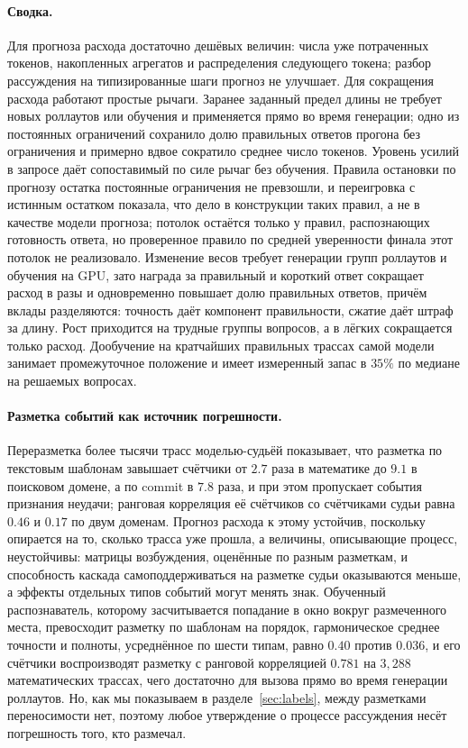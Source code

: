 \documentclass[11pt]{article}
\begin{document}
\paragraph{Сводка.} Для прогноза расхода достаточно дешёвых величин: числа уже потраченных токенов, накопленных агрегатов и распределения следующего токена; разбор рассуждения на типизированные шаги прогноз не улучшает. Для сокращения расхода работают простые рычаги. Заранее заданный предел длины не требует новых роллаутов или обучения и применяется прямо во время генерации; одно из постоянных ограничений сохранило долю правильных ответов прогона без ограничения и примерно вдвое сократило среднее число токенов. Уровень усилий в запросе даёт сопоставимый по силе рычаг без обучения. Правила остановки по прогнозу остатка постоянные ограничения не превзошли, и переигровка с истинным остатком показала, что дело в конструкции таких правил, а не в качестве модели прогноза; потолок остаётся только у правил, распознающих готовность ответа, но проверенное правило по средней уверенности финала этот потолок не реализовало. Изменение весов требует генерации групп роллаутов и обучения на GPU, зато награда за правильный и короткий ответ сокращает расход в разы и одновременно повышает долю правильных ответов, причём вклады разделяются: точность даёт компонент правильности, сжатие даёт штраф за длину. Рост приходится на трудные группы вопросов, а в лёгких сокращается только расход. Дообучение на кратчайших правильных трассах самой модели занимает промежуточное положение и имеет измеренный запас в $35\%$ по медиане на решаемых вопросах.

\paragraph{Разметка событий как источник погрешности.} Переразметка более тысячи трасс моделью-судьёй показывает, что разметка по текстовым шаблонам завышает счётчики от $2.7$ раза в математике до $9.1$ в поисковом домене, а по \textsf{commit} в $7.8$ раза, и при этом пропускает события признания неудачи; ранговая корреляция её счётчиков со счётчиками судьи равна $0.46$ и $0.17$ по двум доменам. Прогноз расхода к этому устойчив, поскольку опирается на то, сколько трасса уже прошла, а величины, описывающие процесс, неустойчивы: матрицы возбуждения, оценённые по разным разметкам, и способность каскада самоподдерживаться на разметке судьи оказываются меньше, а эффекты отдельных типов событий могут менять знак. Обученный распознаватель, которому засчитывается попадание в окно вокруг размеченного места, превосходит разметку по шаблонам на порядок, гармоническое среднее точности и полноты, усреднённое по шести типам, равно $0.40$ против $0.036$, и его счётчики воспроизводят разметку с ранговой корреляцией $0.781$ на $3{,}288$ математических трассах, чего достаточно для вызова прямо во время генерации роллаутов. Но, как мы показываем в разделе~\ref{sec:labels}, между разметками переносимости нет, поэтому любое утверждение о процессе рассуждения несёт погрешность того, кто размечал.
\end{document}
